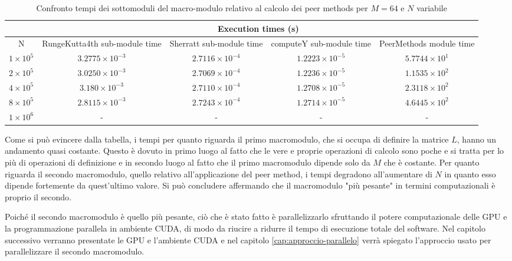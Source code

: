 \begin{table}[ht!]
    \begin{center}
        \renewcommand{\arraystretch}{1.6}
        \begin{adjustbox}{width=1\textwidth}
            \begin{tabular}{ |c|c|c|c|c| }
                \hline
                \multicolumn{1}{|c}{} & \multicolumn{4}{|c|}{Execution times (s)} \\
                \hline 
                N & RungeKutta4th sub-module time & Sherratt sub-module time & computeY sub-module time & PeerMethods module time \\
                \hline 
                $1 \times 10^5$ & $3.2775 \times 10^{-3}$ & $2.7116 \times 10^{-4}$ & $1.2223 \times 10^{-5}$ & $5.7744 \times 10^{1}$ \\ 
                \hline 
                $2 \times 10^5$ & $3.0250 \times 10^{-3}$ & $2.7069 \times 10^{-4}$ & $1.2236 \times 10^{-5}$ & $1.1535 \times 10^{2}$ \\ 
                \hline 
                $4 \times 10^5$ & $3.180 \times 10^{-3}$ & $2.7110 \times 10^{-4}$ & $1.2708 \times 10^{-5}$ & $2.3118 \times 10^{2}$ \\ 
                \hline 
                $8 \times 10^5$ & $2.8115 \times 10^{-3}$ & $2.7243 \times 10^{-4}$ & $1.2714 \times 10^{-5}$ & $4.6445 \times 10^{2}$ \\
                \hline 
                $1 \times 10^6$ & - & - & - & - \\ 
                \hline 
            \end{tabular}
        \end{adjustbox}
    \end{center}
    \caption{Confronto tempi dei sottomoduli del macro-modulo relativo al calcolo dei peer methods per $M = 64$ e $N$ variabile} 
    \label{tab:sub_module_time}
\end{table}

\vspace{0.2cm}

\noindent Come si può evincere dalla tabella, i tempi per quanto riguarda il primo macromodulo, che si occupa di definire la matrice $L$, hanno un andamento quasi costante. Questo è dovuto in primo luogo al fatto che le vere e proprie operazioni di calcolo sono poche e si tratta per lo più di operazioni di definizione e in secondo luogo al fatto che il primo macromodulo dipende solo da $M$ che è costante. Per quanto riguarda il secondo macromodulo, quello relativo all'applicazione del peer method, i tempi degradono all'aumentare di $N$ in quanto esso dipende fortemente da quest'ultimo valore. Si può concludere affermando che il macromodulo "più pesante" in termini computazionali è proprio il secondo.

\noindent Poiché il secondo macromodulo è quello più pesante, ciò che è stato fatto è parallelizzarlo sfruttando il potere computazionale delle GPU e la programmazione parallela in ambiente CUDA, di modo da riucire a ridurre il tempo di esecuzione totale del software. Nel capitolo successivo verranno presentate le GPU e l'ambiente CUDA e nel capitolo \ref{cap:approccio-parallelo} verrà spiegato l'approccio usato per parallelizzare il secondo macromodulo.